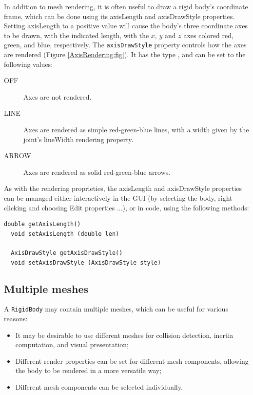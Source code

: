 In addition to mesh rendering, it is often useful to draw a rigid
body's coordinate frame, which can be done using its {\sf axisLength}
and {\sf axisDrawStyle} properties. Setting {\sf axisLength} to a
positive value will cause the body's three coordinate axes to be
drawn, with the indicated length, with the $x$, $y$ and $z$ axes
colored red, green, and blue, respectively. The {\tt axisDrawStyle}
property controls how the axes are rendered (Figure
\ref{AxisRendering:fig}). It has the type
, and can
be set to the following values:
%
\begin{description}

\item[OFF]\mbox{}

Axes are not rendered.

\item[LINE]\mbox{}

Axes are rendered as simple red-green-blue lines,
with a width given by the joint's {\sf lineWidth} rendering property.

\item[ARROW]\mbox{}

Axes are rendered as solid red-green-blue arrows.

\end{description}
%

As with the rendering proprieties, the {\sf axisLength} and {\sf
axisDrawStyle} properties can be managed either interactively in the
GUI (by selecting the body, right clicking and choosing {\sf Edit
properties ...}), or in code, using the following methods:
\begin{lstlisting}[]
  double getAxisLength()
  void setAxisLength (double len)

  AxisDrawStyle getAxisDrawStyle()
  void setAxisDrawStyle (AxisDrawStyle style)
\end{lstlisting}
%

\subsection{Multiple meshes}
\label{rigidBodyMultipleMeshes:sec}

A {\tt RigidBody} may contain multiple meshes, which can be useful for
various reasons:

\begin{itemize}

\item It may be desirable to use different meshes for collision
detection, inertia computation, and visual presentation;

\item Different render properties can be set for different mesh
components, allowing the body to be rendered in a more versatile way;

\item Different mesh components can be selected individually.

\end{itemize}

